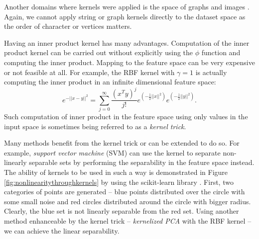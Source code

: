 Another domains where kernels were applied is the space of graphs \cite{graphKernels} and images \cite{imageKernels}. Again, we cannot apply string or graph kernels directly to the dataset space as the order of character or vertices matters. 

Having an inner product kernel has many advantages. Computation of the inner product kernel can be carried out without explicitly using the $\phi$ function and computing the inner product. Mapping to the feature space can be very expensive or not feasible at all. For example, the RBF kernel with $\gamma = 1$ is actually computing the inner product in an infinite dimensional feature space:
\begin{equation*}
e^{-||x-y||^2} = \sum_{j=0}^{\infty}\frac{(x^Ty)^j}{j!}e^{(-\frac{1}{2}||x||^2)}e^{(-\frac{1}{2}||y||^2)}.
\end{equation*}
Such computation of inner product in the feature space using only values in the input space is sometimes being referred to as a \emph{kernel trick}.

Many methods benefit from the kernel trick or can be extended to do so. For example, \emph{support vector machine} (SVM) \cite{svm} can use the kernel to separate non-linearly separable sets by performing the separability in the feature space instead. The ability of kernels to be used in such a way is demonstrated in Figure \ref{fig:nonlinearitythroughkernels} by using the scikit-learn library \cite{scikit-learn}. First, two categories of points are generated -- blue points distributed over the circle with some small noise and red circles distributed around the circle with bigger radius. Clearly, the blue set is not linearly separable from the red set. Using another method enhanceable by the kernel trick -- \emph{kernelized PCA} with the RBF kernel \cite{kernelizedSVM} -- we can achieve the linear separability.

